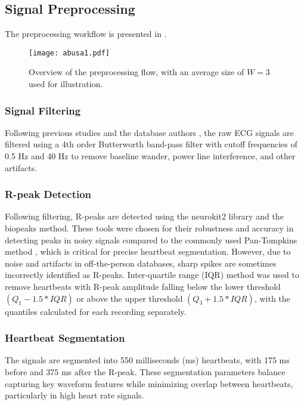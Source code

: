 \subsection{Signal Preprocessing}
The preprocessing workflow is presented in .
\begin{figure}[!t]
\centering
\texttt{[image: abusa1.pdf]}
\caption{Overview of the preprocessing flow, with an average size of $W=3$ used for illustration.}
\label{fig:preprocess_overview}
\end{figure}
\subsubsection{Signal Filtering}
Following previous studies \cite{Jyotishi2022, 8392675} and the database authors \cite{Wahabi2014}, the raw ECG signals are filtered using a 4th order Butterworth band-pass filter with cutoff frequencies of 0.5 Hz and 40 Hz to remove baseline wander, power line interference, and other artifacts.
\subsubsection{R-peak Detection}
Following filtering, R-peaks are detected using the neurokit2\cite{Makowski2021neurokit} library and the biopeaks \cite{Brammer2020} method. These tools were chosen for their robustness and accuracy in detecting peaks in noisy signals compared to the commonly used Pan-Tompkins method \cite{4122029}, which is critical for precise heartbeat segmentation.
However, due to noise and artifacts in off-the-person databases, sharp spikes are sometimes incorrectly identified as R-peaks. Inter-quartile range (IQR) method \cite{Dekking2005} was used to remove heartbeats with R-peak amplitude falling below the lower threshold $(Q_1 - 1.5 * IQR)$ or above the upper threshold $(Q_3 + 1.5 * IQR)$, with the quantiles calculated for each recording separately.
\subsubsection{Heartbeat Segmentation}
The signals are segmented into 550 milliseconds (ms) heartbeats, with 175 ms before and 375 ms after the R-peak. These segmentation parameters balance capturing key waveform features while minimizing overlap between heartbeats, particularly in high heart rate signals.

